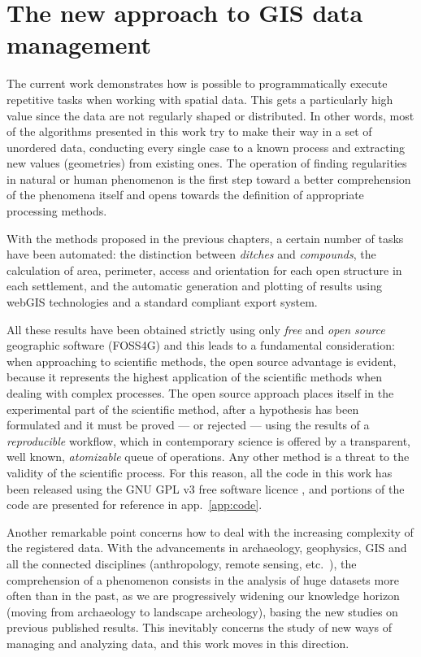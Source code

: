     \section{The new approach to GIS data management}
        The current work demonstrates how is possible to programmatically execute repetitive tasks when working with spatial data. This gets a particularly high value since the data are not regularly shaped or distributed. In other words, most of the algorithms presented in this work try to make their way in a set of unordered data, conducting every single case to a known process and extracting new values (geometries) from existing ones. The operation of finding regularities in natural or human phenomenon is the first step toward a better comprehension of the phenomena itself and opens towards the definition of appropriate processing methods.

        With the methods proposed in the previous chapters, a certain number of tasks have been automated: the distinction between \emph{ditches} and \emph{compounds}, the calculation of area, perimeter, access and orientation for each open structure in each settlement, and the automatic generation and plotting of results using webGIS technologies and a standard compliant export system.

        All these results have been obtained strictly using only \emph{free} and \emph{open source} geographic software (FOSS4G) and this leads to a fundamental consideration: when approaching to scientific methods, the open source advantage is evident, because it represents the highest application of the scientific methods when dealing with complex processes. The open source approach places itself in the experimental part of the scientific method, after a hypothesis has been formulated and it must be proved --- or rejected --- using the results of a \emph{reproducible} workflow, which in contemporary science is offered by a transparent, well known, \emph{atomizable} queue of operations. Any other method is a threat to the validity of the scientific process. For this reason, all the code in this work has been released using the GNU GPL v3 free software licence \cite{wiki:gpl}, and portions of the code are presented for reference in app.~\ref{app:code}.

        Another remarkable point concerns how to deal with the increasing complexity of the registered data. With the advancements in archaeology, geophysics, GIS and all the connected disciplines (anthropology, remote sensing, etc.\ ), the comprehension of a phenomenon consists in the analysis of huge datasets more often than in the past, as we are progressively widening our knowledge horizon (moving from archaeology to landscape archeology), basing the new studies on previous published results. This inevitably concerns the study of new ways of managing and analyzing data, and this work moves in this direction.
        

